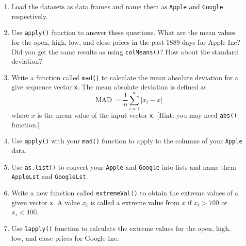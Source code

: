 \documentclass[a4paper]{article}
\begin{document}
\begin{enumerate}
\item Load the datasets as data frames and name them as \texttt{Apple} and \texttt{Google}
  respectively.

\item  Use \texttt{apply()} function to answer these
  questions.  What are the mean values for the open, high, low, and close
  prices in the past 1889 days for Apple Inc? Did you get the same results as
  using \texttt{colMeans()}? How about the standard deviation?

\item Write a function called \texttt{mad()} to calculate the mean absolute
  deviation for a give sequence vector \texttt{x}.  The mean absolute deviation
  is defined as
  \begin{equation*}
    \label{eq:2}
    \operatorname{MAD} = \frac{1}{n} \sum_{i=1}^n{|x_i-\bar x|} 
  \end{equation*}
  where $\bar x$ is the mean value of the input vector \texttt{x}. [Hint: you
  may need \texttt{abs()} function.]

\item Use \texttt{apply()} with your \texttt{mad()} function to apply to the
  columns of your \texttt{Apple} data.

\item Use \texttt{as.list()} to convert your \texttt{Apple} and \texttt{Google}
  into lists and name them \texttt{AppleLst} and \texttt{GoogleLst}.

\item Write a new function called \texttt{extremeVal()} to obtain the extreme
  values of a given vector \texttt{x}. A value $x_i$ is called a extreme value
  from $x$ if $x_i> 700$ or $x_i < 100$.

\item Use \texttt{lapply()} function to calculate the extreme values for the
  open, high, low, and close prices for Google Inc.





\end{enumerate}
\end{document}
